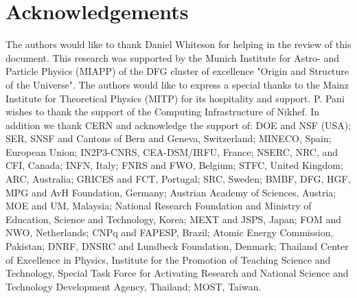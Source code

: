 \chapter{Acknowledgements}

The authors would like to thank Daniel Whiteson for helping in the review of this document. 
This research was supported by the Munich Institute for Astro- and Particle Physics (MIAPP) of the DFG cluster of excellence "Origin and Structure of the Universe". The authors would like to express a special thanks to the Mainz Institute for Theoretical Physics (MITP) for its hospitality and support. P. Pani wishes to thank the support of the Computing Infrastructure of Nikhef.
In addition we thank CERN and acknowledge the support of:
DOE and NSF (USA);
SER, SNSF and Cantons of Bern and Geneva, Switzerland; 
MINECO, Spain;
European Union;
IN2P3-CNRS, CEA-DSM/IRFU, France;
NSERC, NRC, and CFI, Canada;
INFN, Italy;
FNRS and FWO, Belgium; 
STFC, United Kingdom;
ARC, Australia; 
GRICES and FCT, Portugal;
SRC, Sweden;
BMBF, DFG, HGF, MPG and AvH Foundation, Germany; 
Austrian Academy of Sciences, Austria; 
MOE and UM, Malaysia;
National Research Foundation and Ministry of Education, Science and Technology, Korea;
MEXT and JSPS, Japan; 
FOM and NWO, Netherlands;
CNPq and FAPESP, Brazil;
Atomic Energy Commission, Pakistan;
DNRF, DNSRC and Lundbeck Foundation, Denmark;
Thailand Center of Excellence in Physics, Institute for the Promotion of Teaching Science and Technology, Special Task Force for Activating Research and National Science and Technology Development Agency, Thailand; 
MOST, Taiwan.